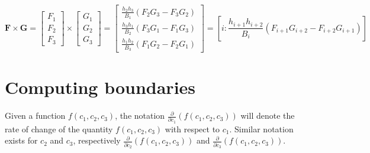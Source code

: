 \begin{itemize}
\[\mathbf{F} \times \mathbf{G} = \begin{bmatrix} F_1 \\ F_2 \\ F_3 \end{bmatrix} \times \begin{bmatrix} G_1 \\ G_2 \\ G_3 \end{bmatrix}
 = \begin{bmatrix} \frac{h_2 h_3}{B_1}(F_2 G_3 - F_3 G_2) \\ \frac{h_3 h_1}{B_2}(F_3 G_1 - F_1 G_3) \\ \frac{h_1 h_2}{B_3}(F_1 G_2 - F_2 G_1) \end{bmatrix}
 = \left[i : \frac{h_{i+1} h_{i+2}}{B_i} (F_{i+1} G_{i+2} - F_{i+2} G_{i+1})\right]\]



%
%
%
%
%
\end{itemize}





\section{Computing boundaries}

Given a function \(f(c_1, c_2, c_3)\), the notation \(\frac{\partial}{\partial c_1}(f(c_1, c_2, c_3))\) will denote the rate of change of the quantity \(f(c_1, c_2, c_3)\) with respect to \(c_1\). Similar notation exists for \(c_2\) and \(c_3\), respectively \(\frac{\partial}{\partial c_2}(f(c_1, c_2, c_3))\) and \(\frac{\partial}{\partial c_3}(f(c_1, c_2, c_3))\).

